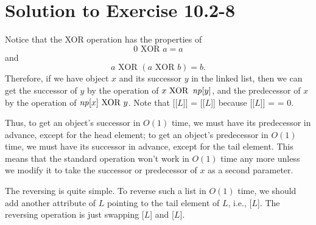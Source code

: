 \documentclass[a4paper, fleqn]{article}
\begin{document}
\section*{Solution to Exercise 10.2-8}

Notice that the XOR operation has the properties of
\[0 \mbox{ XOR } a = a\]
and
\[a \mbox{ XOR } (a \mbox{ XOR } b) = b.\]
Therefore, if we have object $x$ and its successor $y$ in the linked
list, then we can get the successor of $y$ by the operation of $x
\mbox{ XOR } \id{np}[y]$, and the predecessor of $x$ by the operation
of $\id{np}[x] \mbox{ XOR } y$.  Note that [[$L$]] =
[[$L$]] because [[$L$]] =
 = 0.

Thus, to get an object's successor in $O(1)$ time, we must have its
predecessor in advance, except for the head element; to get an
object's predecessor in $O(1)$ time, we must have its successor in
advance, except for the tail element. This means that the
standard  operation won't work in $O(1)$ time any more
unless we modify it to take the successor or predecessor of $x$ as a
second parameter.

The reversing is quite simple. To reverse such a list in $O(1)$ time,
we should add another attribute of $L$ pointing to the tail element of
$L$, i.e., [$L$]. The reversing operation is just swapping
[$L$] and [$L$].
\end{document}
